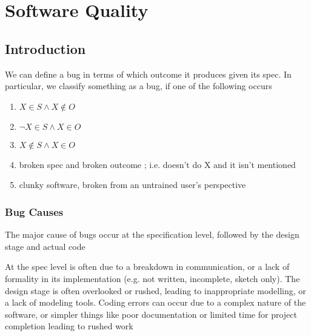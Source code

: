 \section{Software Quality}


	\subsection{Introduction}




	\par{We can define a bug in terms of which outcome it produces given its
spec. In particular, we classify something as a bug, if one of the following
occurs}

		\begin{enumerate}
			\item $X \in S \land X \not\in O$
			\item $\neg X \in S \land X \in O$ 
			\item $X \not\in S \land X \in O$
			\item broken spec and broken outcome ; i.e. doesn't do X and it
isn't mentioned 
			\item clunky software, broken from an untrained user's perspective 
		\end{enumerate}
	
		\subsubsection{Bug Causes}

		\par{The major cause of bugs occur at the specification level, followed
by the design stage and actual code}
		\par{At the spec level is often due to a breakdown in communication, or
a lack of formality in its implementation (e.g. not written, incomplete, sketch
only). The design stage is often overlooked or rushed, leading to
inappropriate modelling, or a lack of modeling tools. Coding errors can occur
due to a complex nature of the software, or simpler things like poor
documentation or limited time for project completion leading to rushed work}

